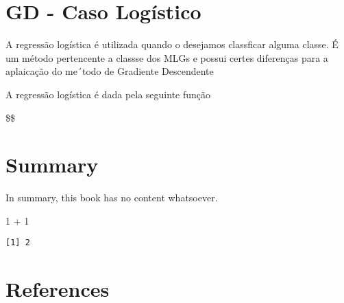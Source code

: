 \documentclass[
  letterpaper,
  DIV=11,
  numbers=noendperiod]{scrreprt}
\newenvironment{Shaded}{\begin{snugshade}}{\end{snugshade}}
\newcommand{\DecValTok}[1]{\textcolor[rgb]{0.68,0.00,0.00}{#1}}
\newcommand{\SpecialCharTok}[1]{\textcolor[rgb]{0.37,0.37,0.37}{#1}}
\newlength{\cslhangindent}
\newlength{\cslentryspacingunit} %
\newenvironment{CSLReferences}[2] %
 {%
  \setlength{\parindent}{0pt}
  \ifodd #1
  \let\oldpar\par
  \def\par{\hangindent=\cslhangindent\oldpar}
  \fi
  \setlength{\parskip}{#2\cslentryspacingunit}
 }%
 {}
\begin{document}

\hypertarget{gd---caso-loguxedstico}{%
\chapter{GD - Caso Logístico}\label{gd---caso-loguxedstico}}

A regressão logística é utilizada quando o desejamos classficar alguma
classe. É um método pertencente a classse dos MLGs e possui certes
diferenças para a aplaicação do me´todo de Gradiente Descendente

A regressão logística é dada pela seguinte função

\$\$


\hypertarget{summary}{%
\chapter{Summary}\label{summary}}

In summary, this book has no content whatsoever.

\begin{Shaded}
\begin{Highlighting}[]
\DecValTok{1} \SpecialCharTok{+} \DecValTok{1}
\end{Highlighting}
\end{Shaded}

\begin{verbatim}
[1] 2
\end{verbatim}


\hypertarget{references}{%
\chapter*{References}\label{references}}


\hypertarget{refs}{}
\begin{CSLReferences}{0}{0}
\end{CSLReferences}
\end{document}

